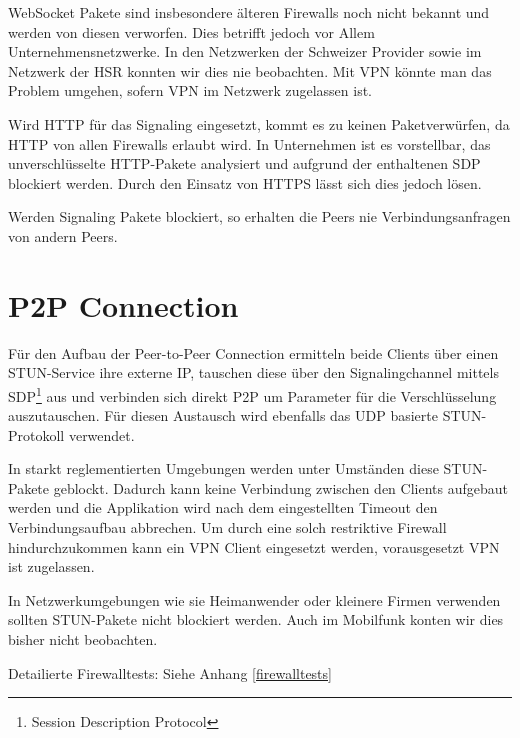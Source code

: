 		WebSocket Pakete sind insbesondere älteren Firewalls noch nicht bekannt und werden von diesen verworfen. Dies betrifft jedoch vor Allem Unternehmensnetzwerke.
		In den Netzwerken der Schweizer Provider sowie im Netzwerk der HSR konnten wir dies nie beobachten.
		Mit VPN könnte man das Problem umgehen, sofern VPN im Netzwerk zugelassen ist.
		
		Wird HTTP für das Signaling eingesetzt, kommt es zu keinen Paketverwürfen, da HTTP von allen Firewalls erlaubt wird.
		In Unternehmen ist es vorstellbar, das unverschlüsselte HTTP-Pakete analysiert und aufgrund der enthaltenen SDP blockiert werden. Durch den Einsatz von HTTPS lässt sich dies jedoch lösen.
		
		Werden Signaling Pakete blockiert, so erhalten die Peers nie Verbindungsanfragen von andern Peers.
		

	\section{P2P Connection}
		Für den Aufbau der Peer-to-Peer Connection ermitteln beide Clients über einen
		STUN-Service ihre externe IP, tauschen diese über den Signalingchannel
		mittels SDP\footnote{Session Description Protocol} aus und verbinden sich
		direkt P2P um Parameter für die Verschlüsselung auszutauschen. Für diesen
		Austausch wird ebenfalls das UDP basierte STUN-Protokoll verwendet.
		
		In starkt reglementierten Umgebungen werden unter Umständen diese STUN-Pakete
		geblockt. Dadurch kann keine Verbindung zwischen den Clients aufgebaut werden und die Applikation wird nach dem eingestellten Timeout den Verbindungsaufbau abbrechen. 
		Um durch eine solch restriktive Firewall hindurchzukommen kann ein VPN Client eingesetzt werden, vorausgesetzt VPN ist zugelassen.
		
		In Netzwerkumgebungen wie sie Heimanwender oder kleinere Firmen verwenden sollten STUN-Pakete nicht blockiert werden. Auch im Mobilfunk konten wir dies bisher nicht beobachten.
	
		Detailierte Firewalltests: Siehe Anhang \ref{firewalltests}
		
		